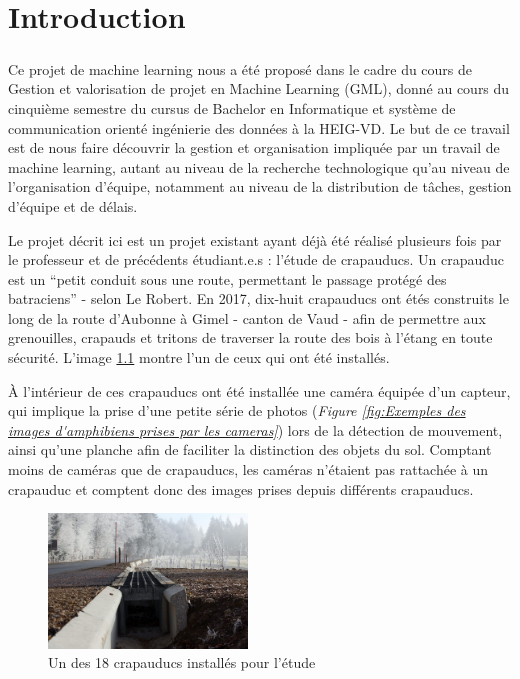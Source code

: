 \chapter{Introduction}
\paragraph*{}
Ce projet de machine learning nous a été proposé dans le cadre du cours de Gestion et valorisation de projet en Machine Learning (GML), donné au cours du cinquième semestre du cursus de Bachelor en Informatique et système de communication orienté ingénierie des données à la HEIG-VD. Le but de ce travail est de nous faire découvrir la gestion et organisation impliquée par un travail de machine learning, autant au niveau de la recherche technologique qu'au niveau de l'organisation d'équipe, notamment au niveau de la distribution de tâches, gestion d'équipe et de délais. \newline

Le projet décrit ici est un projet existant ayant déjà été réalisé plusieurs fois par le professeur et de précédents étudiant.e.s : l'étude de crapauducs. Un crapauduc est un “petit conduit sous une route, permettant le passage protégé des batraciens” - selon Le Robert. En 2017, dix-huit crapauducs ont étés construits le long de la route d'Aubonne à Gimel - canton de Vaud - afin de permettre aux grenouilles, crapauds et tritons de traverser la route des bois à l'étang en toute sécurité. L'image \ref{fig:Un des 18 crapauducs installés pour l'étude} montre l'un de ceux qui ont été installés. \newline

À l'intérieur de ces crapauducs ont été installée une caméra équipée d'un capteur, qui implique la prise d'une petite série de photos (\textit{Figure \ref{fig:Exemples des images d'amphibiens prises par les cameras}}) lors de la détection de mouvement, ainsi qu'une planche afin de faciliter la distinction des objets du sol. Comptant moins de caméras que de crapauducs, les caméras n'étaient pas rattachée à un crapauduc et comptent donc des images prises depuis différents crapauducs.\newline

\begin{figure}[!htb]
    \centering
    \includegraphics[width=200px]{images/introduction_crapauduc_exterieur.png}
    \caption{Un des 18 crapauducs installés pour l'étude}
    \label{fig:Un des 18 crapauducs installés pour l'étude}
\end{figure}

